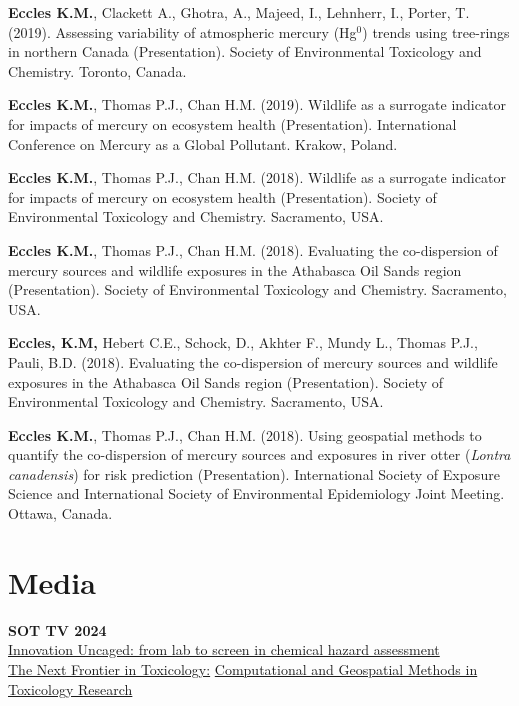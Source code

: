 \documentclass[margin,line]{res}
\begin{document}
\begin{resume}
\begin{etaremune}[start=12]
\item \textbf{Eccles K.M.}, Clackett A., Ghotra, A., Majeed, I., Lehnherr, I., Porter, T. (2019). Assessing variability of atmospheric mercury (Hg$^{0}$) trends using tree-rings in northern Canada (Presentation). Society of Environmental Toxicology and Chemistry. Toronto, Canada.

\item \textbf{Eccles K.M.}, Thomas P.J., Chan H.M. (2019). Wildlife as a surrogate indicator for impacts of mercury on ecosystem health (Presentation). International Conference on Mercury as a Global Pollutant. Krakow, Poland.

\item \textbf{Eccles K.M.}, Thomas P.J., Chan H.M. (2018). Wildlife as a surrogate indicator for impacts of mercury on ecosystem health (Presentation). Society of Environmental Toxicology and Chemistry. Sacramento, USA.

\item \textbf{Eccles K.M.}, Thomas P.J., Chan H.M. (2018). Evaluating the co-dispersion of mercury sources and wildlife exposures in the Athabasca Oil Sands region (Presentation). Society of Environmental Toxicology and Chemistry. Sacramento, USA.

\item \textbf{Eccles, K.M,} Hebert C.E., Schock, D., Akhter F., Mundy L., Thomas P.J., Pauli, B.D. (2018). Evaluating the co-dispersion of mercury sources and wildlife exposures in the Athabasca Oil Sands region (Presentation). Society of Environmental Toxicology and Chemistry. Sacramento, USA.

\item \textbf{Eccles K.M.}, Thomas P.J., Chan H.M. (2018). Using geospatial methods to quantify the co-dispersion of mercury sources and exposures in river otter (\textit{Lontra canadensis}) for risk prediction (Presentation). International Society of Exposure Science and International Society of Environmental Epidemiology Joint Meeting. Ottawa, Canada.

\end{etaremune}

\vspace*{.1in}
\section{\sc Media}
\textbf{SOT TV 2024}\\
\href{https://www.youtube.com/watch?v=6Pg7DvoHgP0}{Innovation Uncaged: from lab to screen in chemical hazard assessment}\\
\href{https://www.youtube.com/watch?v=-vlSMeWfeKs\&t=939s}{The Next Frontier in Toxicology:}
\href{https://www.youtube.com/watch?v=vgu6d1uT8K4}{Computational and Geospatial Methods in Toxicology Research}


\end{resume}
\end{document}
